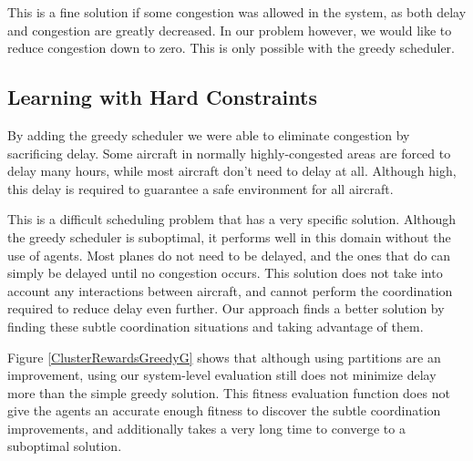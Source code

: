 \documentclass{sig-alternate}
\begin{document}
This is a fine solution if some congestion was allowed in the system, as both delay and congestion are greatly decreased. In our problem however, we would like to reduce congestion down to zero. This is only possible with the greedy scheduler.

\subsection{Learning with Hard Constraints}
By adding the greedy scheduler we were able to eliminate congestion by sacrificing delay. Some aircraft in normally highly-congested areas are forced to delay many hours, while most aircraft don't need to delay at all. Although high, this delay is required to guarantee a safe environment for all aircraft. 

This is a difficult scheduling problem that has a very specific solution. Although the greedy scheduler is suboptimal, it performs well in this domain without the use of agents. Most planes do not need to be delayed, and the ones that do can simply be delayed until no congestion occurs. This solution does not take into account any interactions between aircraft, and cannot perform the coordination required to reduce delay even further. Our approach finds a better solution by finding these subtle coordination situations and taking advantage of them.  

Figure \ref{ClusterRewardsGreedyG} shows that although using partitions are an improvement, using our system-level evaluation still does not minimize delay more than the simple greedy solution. This fitness evaluation function does not give the agents an accurate enough fitness to discover the subtle coordination improvements, and additionally takes a very long time to converge to a suboptimal solution. 
\end{document}
